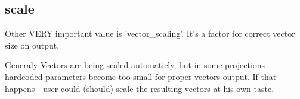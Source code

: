 \documentclass[a4paper,10pt]{article}
\begin{document}
\subsection{scale}

Other VERY important value is 'vector\_scaling'.
It`s a factor for correct vector size on output. 

Generaly Vectors are being scaled automaticly, but in some projections 
hardcoded parameters become too small for proper vectors output.
If that happens - user could (should) scale the resulting vectors 
at his own taste.
\end{document}
